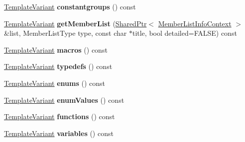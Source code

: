 \begin{DoxyCompactItemize}
\mbox{\hyperlink{class_template_variant}{Template\+Variant}} {\bfseries constantgroups} () const
\item 
\mbox{\label{class_module_context_1_1_private_a8be4669e902a24f58c3c7d4d1fcb68cd}} 
\mbox{\hyperlink{class_template_variant}{Template\+Variant}} {\bfseries get\+Member\+List} (\mbox{\hyperlink{class_shared_ptr}{Shared\+Ptr}}$<$ \mbox{\hyperlink{class_member_list_info_context}{Member\+List\+Info\+Context}} $>$ \&list, Member\+List\+Type type, const char $\ast$title, bool detailed=F\+A\+L\+SE) const
\item 
\mbox{\label{class_module_context_1_1_private_ab024817eae14378cb39fe98407a9eeaa}} 
\mbox{\hyperlink{class_template_variant}{Template\+Variant}} {\bfseries macros} () const
\item 
\mbox{\label{class_module_context_1_1_private_a67658615abbf4ac5a3914d0c9232c80b}} 
\mbox{\hyperlink{class_template_variant}{Template\+Variant}} {\bfseries typedefs} () const
\item 
\mbox{\label{class_module_context_1_1_private_a0f6b33015d4634a2cc80c1934ea0b029}} 
\mbox{\hyperlink{class_template_variant}{Template\+Variant}} {\bfseries enums} () const
\item 
\mbox{\label{class_module_context_1_1_private_ae48d5ad44e3741d2a01b25859c2b34a0}} 
\mbox{\hyperlink{class_template_variant}{Template\+Variant}} {\bfseries enum\+Values} () const
\item 
\mbox{\label{class_module_context_1_1_private_abf994efd354bff5cb8498824e5d4e685}} 
\mbox{\hyperlink{class_template_variant}{Template\+Variant}} {\bfseries functions} () const
\item 
\mbox{\label{class_module_context_1_1_private_a409e6e98c32de96c83b4e58a7744cd93}} 
\mbox{\hyperlink{class_template_variant}{Template\+Variant}} {\bfseries variables} () const
\item 
\mbox{\label{class_module_context_1_1_private_a356d008c8f164afc61a3ee39bf17d46f}} 

\end{DoxyCompactItemize}

